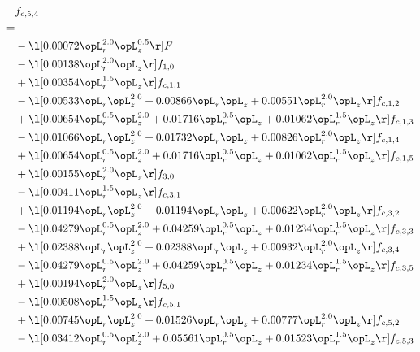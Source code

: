\begin{alignat}{2} 
\label{eq:f_54_1} 
& f_{c,5,4} \nonumber \\ 
 = \\ 
& - \l[  0.00072 \opL_r^{2.0} \opL_z^{0.5}  \r] F \nonumber \\ 
& - \l[  0.00138 \opL_r^{2.0} \opL_z  \r] f_{1,0} \nonumber \\ 
& + \l[  0.00354 \opL_r^{1.5} \opL_z  \r] f_{c,1,1} \nonumber \\ 
& - \l[  0.00533 \opL_r \opL_z^{2.0} +  0.00866 \opL_r \opL_z +  0.00551 \opL_r^{2.0} \opL_z  \r] f_{c,1,2} \nonumber \\ 
& + \l[  0.00654 \opL_r^{0.5} \opL_z^{2.0} +  0.01716 \opL_r^{0.5} \opL_z +  0.01062 \opL_r^{1.5} \opL_z  \r] f_{c,1,3} \nonumber \\ 
& - \l[  0.01066 \opL_r \opL_z^{2.0} +  0.01732 \opL_r \opL_z +  0.00826 \opL_r^{2.0} \opL_z  \r] f_{c,1,4} \nonumber \\ 
& + \l[  0.00654 \opL_r^{0.5} \opL_z^{2.0} +  0.01716 \opL_r^{0.5} \opL_z +  0.01062 \opL_r^{1.5} \opL_z  \r] f_{c,1,5} \nonumber \\ 
& + \l[  0.00155 \opL_r^{2.0} \opL_z  \r] f_{3,0} \nonumber \\ 
& - \l[  0.00411 \opL_r^{1.5} \opL_z  \r] f_{c,3,1} \nonumber \\ 
& + \l[  0.01194 \opL_r \opL_z^{2.0} +  0.01194 \opL_r \opL_z +  0.00622 \opL_r^{2.0} \opL_z  \r] f_{c,3,2} \nonumber \\ 
& - \l[  0.04279 \opL_r^{0.5} \opL_z^{2.0} +  0.04259 \opL_r^{0.5} \opL_z +  0.01234 \opL_r^{1.5} \opL_z  \r] f_{c,3,3} \nonumber \\ 
& + \l[  0.02388 \opL_r \opL_z^{2.0} +  0.02388 \opL_r \opL_z +  0.00932 \opL_r^{2.0} \opL_z  \r] f_{c,3,4} \nonumber \\ 
& - \l[  0.04279 \opL_r^{0.5} \opL_z^{2.0} +  0.04259 \opL_r^{0.5} \opL_z +  0.01234 \opL_r^{1.5} \opL_z  \r] f_{c,3,5} \nonumber \\ 
& + \l[  0.00194 \opL_r^{2.0} \opL_z  \r] f_{5,0} \nonumber \\ 
& - \l[  0.00508 \opL_r^{1.5} \opL_z  \r] f_{c,5,1} \nonumber \\ 
& + \l[  0.00745 \opL_r \opL_z^{2.0} +  0.01526 \opL_r \opL_z +  0.00777 \opL_r^{2.0} \opL_z  \r] f_{c,5,2} \nonumber \\ 
& - \l[  0.03412 \opL_r^{0.5} \opL_z^{2.0} +  0.05561 \opL_r^{0.5} \opL_z +  0.01523 \opL_r^{1.5} \opL_z  \r] f_{c,5,3} \nonumber \\ 

\end{alignat}
